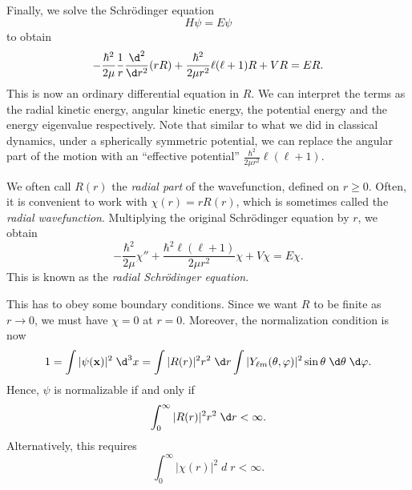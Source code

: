 \documentclass[a4paper]{article}
\begin{document}
Finally, we solve the Schr\"odinger equation
\[
  H \psi = E \psi
\]
to obtain
\[
  -\frac{\hbar^2}{2 \mu} \frac{1}{r} \frac{\d^2}{\d r^2} (rR) + \frac{\hbar^2}{2 \mu r^2 } \ell(\ell + 1) R + VR = ER.
\]
This is now an ordinary differential equation in $R$. We can interpret the terms as the radial kinetic energy, angular kinetic energy, the potential energy and the energy eigenvalue respectively. Note that similar to what we did in classical dynamics, under a spherically symmetric potential, we can replace the angular part of the motion with an ``effective potential'' $\frac{\hbar^2}{2\mu r^2} \ell(\ell + 1)$.

We often call $R(r)$ the \emph{radial part} of the wavefunction, defined on $r \geq 0$. Often, it is convenient to work with $\chi(r) = r R(r)$, which is sometimes called the \emph{radial wavefunction}. Multiplying the original Schr\"odinger equation by $r$, we obtain
\[
  -\frac{\hbar^2}{2 \mu} \chi'' + \frac{\hbar^2 \ell(\ell + 1)}{2 \mu r^2} \chi + V \chi = E \chi.
\]
This is known as the \emph{radial Schr\"odinger equation}.

This has to obey some boundary conditions. Since we want $R$ to be finite as $r \to 0$, we must have $\chi = 0$ at $r = 0$. Moreover, the normalization condition is now
\[
  1 = \int |\psi(\mathbf{x})|^2 \;\d^3 x = \int |R(r)|^2 r^2 \;\d r \int |Y_{\ell m}(\theta, \varphi)|^2 \sin \theta \;\d \theta \;\d \varphi.
\]
Hence, $\psi$ is normalizable if and only if
\[
  \int_0^\infty |R(r)|^2 r^2 \;\d r < \infty.
\]
Alternatively, this requires
\[
  \int_0^\infty |\chi(r)|^2 \;d\; r < \infty.
\]
\end{document}
